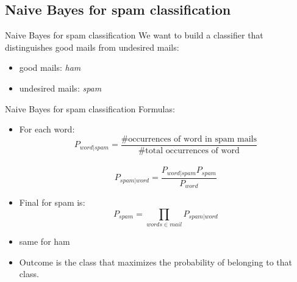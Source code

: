 \documentclass[xcolor=x11names,compress]{beamer}
\renewcommand{\(}{\begin{columns}}
\renewcommand{\)}{\end{columns}}
\newcommand{\<}[1]{\begin{column}{#1}}
\renewcommand{\>}{\end{column}}
\begin{document}
\subsection{Naive Bayes for spam classification}
\begin{frame}{Naive Bayes for spam classification}
We want to build a classifier that distinguishes good mails from undesired mails:
\begin{itemize}
    \item good mails: \textit{ham}
    \item undesired mails: \textit{spam}
\end{itemize}
\end{frame}


\begin{frame}{Naive Bayes for spam classification}
Formulas:
\begin{itemize}
    \item<1->For each word: $$P_{word|spam} = \frac{\mbox{\# occurrences of word in spam mails}}{\mbox{\# total occurrences of word}}$$\\
    $$P_{spam|word} = \frac{P_{word|spam}P_{spam}}{P_{word}}$$
    \item<2->Final for spam is: $$P_{spam} = \prod_{words \in mail} P_{spam|word}$$
    \item<3->same for ham
    \item<4->Outcome is the class that maximizes the probability of belonging to that class.
\end{itemize}
\end{frame}

\end{document}
